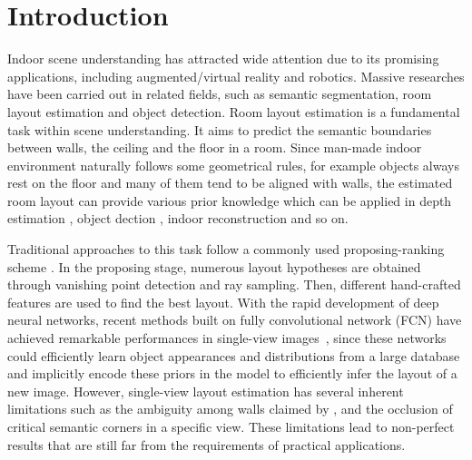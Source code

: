 \section{Introduction}

Indoor scene understanding has attracted wide attention due to its promising applications, including augmented/virtual reality and robotics. Massive researches have been carried out in related fields, such as semantic segmentation, room layout estimation and object detection. 
Room layout estimation is a fundamental task within scene understanding. It aims to predict the semantic boundaries between walls, the ceiling and the floor in a room. 
Since man-made indoor environment naturally follows some geometrical rules, for example objects always rest on the floor and many of them tend to be aligned with walls, the estimated room layout can provide various prior knowledge which can be applied in depth estimation \cite{eigen2014depth}, object dection \cite{hedau2010thinking}, indoor reconstruction \cite{lee2017joint} and so on.

%
Traditional approaches to this task follow a commonly used proposing-ranking scheme \cite{hedau2009recovering,wang2013discriminative,gupta2010estimating,hedau2010thinking}. In the proposing stage, numerous layout hypotheses are obtained through vanishing point detection and ray sampling. Then, different hand-crafted features are used to find the best layout. 
With the rapid development of deep neural networks, recent methods built on fully convolutional network (FCN) have achieved remarkable performances in single-view images~\cite{mallya2015learning,dasgupta2016delay,ren2016coarse,zhao2017physics,LeeRoomNet17,ICIP2018}, since these networks could efficiently learn object appearances and distributions from a large database and implicitly encode these priors in the model to efficiently infer the layout of a new image. 
%
However, single-view layout estimation has several inherent limitations such as the ambiguity among walls claimed by \cite{dasgupta2016delay}, and the occlusion of critical semantic corners in a specific view. These limitations lead to non-perfect results that are still far from the requirements of practical applications.


